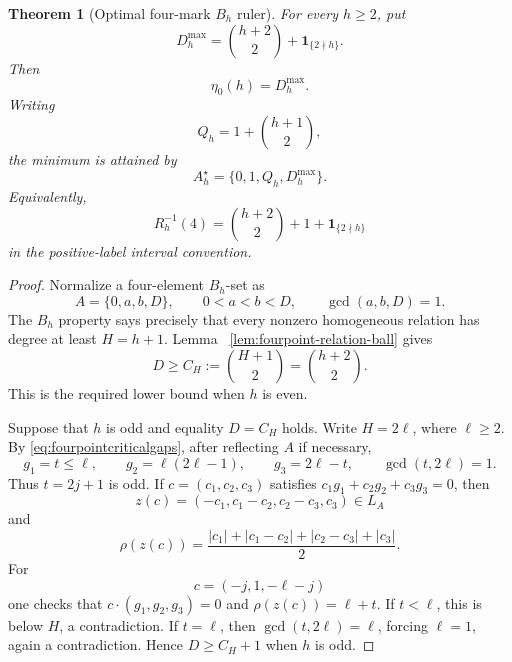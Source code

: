 \documentclass[11pt,reqno]{amsart}
\newtheorem{theorem}{Theorem}[section]
\theoremstyle{definition}
\theoremstyle{remark}
\begin{document}
\begin{theorem}[Optimal four-mark $B_h$ ruler]
\label{thm:optimal-four-mark}
For every $h\geq2$, put
\[
 D_h^{\max}=\binom{h+2}{2}+\mathbf 1_{\{2\nmid h\}}.
\]
Then
\begin{equation}\label{eq:optimal-four-mark}
 \boxed{\qquad \eta_0(h)=D_h^{\max}.\qquad}
\end{equation}
Writing
\[
 Q_h=1+\binom{h+1}{2},
\]
the minimum is attained by
\begin{equation}\label{eq:optimal-four-mark-witness}
 A_h^\star=\{0,1,Q_h,D_h^{\max}\}.
\end{equation}
Equivalently,
\[
 R_h^{-1}(4)=\binom{h+2}{2}+1+\mathbf 1_{\{2\nmid h\}}
\]
in the positive-label interval convention.
\end{theorem}

\begin{proof}
Normalize a four-element $B_h$-set as
\[
 A=\{0,a,b,D\},\qquad 0<a<b<D,\qquad \gcd(a,b,D)=1.
\]
The $B_h$ property says precisely that every nonzero homogeneous relation
has degree at least $H=h+1$.  Lemma~
\ref{lem:fourpoint-relation-ball} gives
\[
 D\geq C_H:=\binom{H+1}{2}=\binom{h+2}{2}.
\]
This is the required lower bound when $h$ is even.

Suppose that $h$ is odd and equality $D=C_H$ holds.  Write
$H=2\ell$, where $\ell\geq2$.  By
\eqref{eq:fourpointcriticalgaps}, after reflecting $A$ if necessary,
\[
 g_1=t\leq\ell,\qquad
 g_2=\ell(2\ell-1),\qquad
 g_3=2\ell-t,\qquad
 \gcd(t,2\ell)=1.
\]
Thus $t=2j+1$ is odd.  If
$c=(c_1,c_2,c_3)$ satisfies
$c_1g_1+c_2g_2+c_3g_3=0$, then
\[
 z(c)=(-c_1,c_1-c_2,c_2-c_3,c_3)\in L_A
\]
and
\[
 \rho(z(c))
 =\frac{|c_1|+|c_1-c_2|+|c_2-c_3|+|c_3|}{2}.
\]
For
\[
 c=(-j,1,-\ell-j)
\]
one checks that $c\cdot(g_1,g_2,g_3)=0$ and
$\rho(z(c))=\ell+t$.  If $t<\ell$, this is below $H$, a
contradiction.  If $t=\ell$, then
$\gcd(t,2\ell)=\ell$, forcing $\ell=1$, again a contradiction.
Hence $D\geq C_H+1$ when $h$ is odd.


\end{proof}
\end{document}
